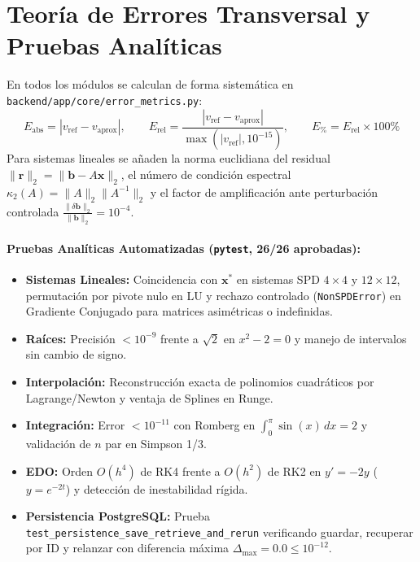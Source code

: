 \documentclass[11pt,a4paper]{article}
\begin{document}
\section{Teoría de Errores Transversal y Pruebas Analíticas}
En todos los módulos se calculan de forma sistemática en \texttt{backend/app/core/error\_metrics.py}:
\[
    E_{\text{abs}} = |v_{\text{ref}} - v_{\text{aprox}}|, \qquad
    E_{\text{rel}} = \frac{|v_{\text{ref}} - v_{\text{aprox}}|}{\max(|v_{\text{ref}}|, 10^{-15})}, \qquad
    E_{\%} = E_{\text{rel}} \times 100\%
\]
Para sistemas lineales se añaden la norma euclidiana del residual $\|\mathbf{r}\|_2=\|\mathbf{b}-A\mathbf{x}\|_2$, el número de condición espectral $\kappa_2(A)=\|A\|_2\|A^{-1}\|_2$ y el factor de amplificación ante perturbación controlada $\frac{\|\delta\mathbf{b}\|_2}{\|\mathbf{b}\|_2}=10^{-4}$.

\paragraph{Pruebas Analíticas Automatizadas (\texttt{pytest}, 26/26 aprobadas):}
\begin{itemize}[noitemsep]
    \item \textbf{Sistemas Lineales:} Coincidencia con $\mathbf{x}^*$ en sistemas SPD $4\times 4$ y $12\times 12$, permutación por pivote nulo en LU y rechazo controlado (\texttt{NonSPDError}) en Gradiente Conjugado para matrices asimétricas o indefinidas.
    \item \textbf{Raíces:} Precisión $<10^{-9}$ frente a $\sqrt{2}$ en $x^2-2=0$ y manejo de intervalos sin cambio de signo.
    \item \textbf{Interpolación:} Reconstrucción exacta de polinomios cuadráticos por Lagrange/Newton y ventaja de Splines en Runge.
    \item \textbf{Integración:} Error $<10^{-11}$ con Romberg en $\int_0^\pi \sin(x)\,dx=2$ y validación de $n$ par en Simpson 1/3.
    \item \textbf{EDO:} Orden $O(h^4)$ de RK4 frente a $O(h^2)$ de RK2 en $y'=-2y$ ($y=e^{-2t}$) y detección de inestabilidad rígida.
    \item \textbf{Persistencia PostgreSQL:} Prueba \texttt{test\_persistence\_save\_retrieve\_and\_rerun} verificando guardar, recuperar por ID y relanzar con diferencia máxima $\Delta_{\max} = 0.0 \le 10^{-12}$.
\end{itemize}
\end{document}
